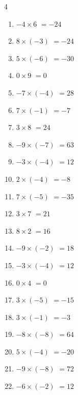\begin{multicols}{4}
\begin{enumerate}
  \item $-4\times 6$
        $=-24$

  \item $8\times (-3)$
        $=-24$

  \item $5\times (-6)$
        $=-30$

  \item $0\times 9$
        $=0$

  \item $-7\times (-4)$
        $=28$

  \item $7\times (-1)$
        $=-7$

  \item $3\times 8$
        $=24$

  \item $-9\times (-7)$
        $=63$

  \item $-3\times (-4)$
        $=12$

\columnbreak %

\resetques

  \item $2\times (-4)$
        $=-8$

  \item $7\times (-5)$
        $=-35$

  \item $3\times 7$
        $=21$

  \item $8\times 2$
        $=16$

  \item $-9\times (-2)$
        $=18$

  \item $-3\times (-4)$
        $=12$

  \item $0\times 4$
        $=0$

  \item $3\times (-5)$
        $=-15$

  \item $3\times (-1)$
        $=-3$

  \item $-8\times (-8)$
        $=64$

  \item $5\times (-4)$
        $=-20$

  \item $-9\times (-8)$
        $=72$

  \item $-6\times (-2)$
        $=12$


\end{enumerate}
\end{multicols}

